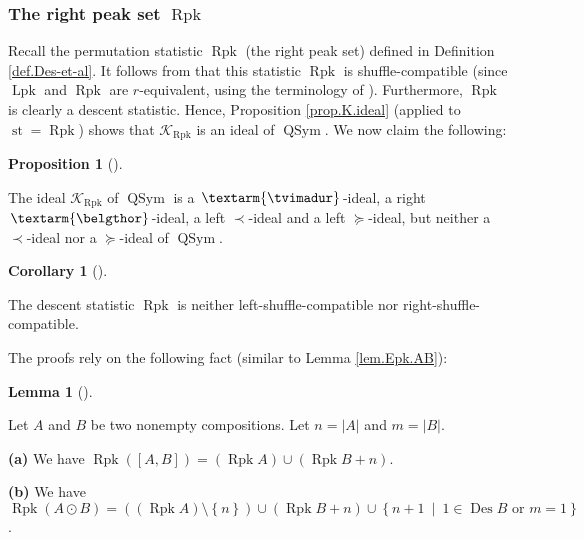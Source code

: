 \documentclass[numbers=enddot,12pt,final,onecolumn,notitlepage]{scrartcl}%
\theoremstyle{definition}
\newtheorem{lem}[theo]{Lemma}
\newenvironment{lemma}[1][]
{\begin{lem}[#1]\begin{leftbar}}
{\end{leftbar}\end{lem}}
\newtheorem{prop}[theo]{Proposition}
\newenvironment{proposition}[1][]
{\begin{prop}[#1]\begin{leftbar}}
{\end{leftbar}\end{prop}}
\newtheorem{coro}[theo]{Corollary}
\newenvironment{corollary}[1][]
{\begin{coro}[#1]\begin{leftbar}}
{\end{leftbar}\end{coro}}
\newcommand{\tvi}{\left. \textarm{\tvimadur} \right.}
\newcommand{\bel}{\left. \textarm{\belgthor} \right.}
\begin{document}
\subsubsection{The right peak set $\operatorname*{Rpk}$}

Recall the permutation statistic $\operatorname*{Rpk}$ (the right peak set)
defined in Definition \ref{def.Des-et-al}. It follows from \cite[Theorem 4.9
\textbf{(a)} and Theorem 3.5]{part1} that this statistic $\operatorname*{Rpk}$
is shuffle-compatible (since $\operatorname{Lpk}$ and $\operatorname{Rpk}$ are
$r$-equivalent, using the terminology of \cite{part1}). Furthermore,
$\operatorname*{Rpk}$ is clearly a descent statistic. Hence, Proposition
\ref{prop.K.ideal} (applied to $\operatorname*{st}=\operatorname*{Rpk}$) shows
that $\mathcal{K}_{\operatorname*{Rpk}}$ is an ideal of $\operatorname*{QSym}%
$. We now claim the following:

\begin{proposition}
\label{prop.Rpk.dend}The ideal $\mathcal{K}_{\operatorname*{Rpk}}$ of
$\operatorname*{QSym}$ is a $\tvi$-ideal, a right $\bel$-ideal, a left
$\left.  \prec\right.  $-ideal and a left $\left.  \succeq\right.  $-ideal,
but neither a $\left.  \prec\right.  $-ideal nor a $\left.  \succeq\right.
$-ideal of $\operatorname*{QSym}$.
\end{proposition}

\begin{corollary}
\label{cor.dendri.Rpk}The descent statistic $\operatorname*{Rpk}$ is neither
left-shuffle-compatible nor right-shuffle-compatible.
\end{corollary}

The proofs rely on the following fact (similar to Lemma \ref{lem.Epk.AB}):

\begin{lemma}
\label{lem.Rpk.AB}Let $A$ and $B$ be two nonempty compositions. Let
$n=\left\vert A\right\vert $ and $m=\left\vert B\right\vert $.

\textbf{(a)} We have $\operatorname*{Rpk}\left(  \left[  A,B\right]  \right)
=\left(  \operatorname*{Rpk}A\right)  \cup\left(  \operatorname*{Rpk}%
B+n\right)  $.

\textbf{(b)} We have $\operatorname*{Rpk}\left(  A\odot B\right)  =\left(
\left(  \operatorname*{Rpk}A\right)  \setminus\left\{  n\right\}  \right)
\cup\left(  \operatorname*{Rpk}B+n\right)  \cup\left\{  n+1\ \mid
\ 1\in\operatorname*{Des}B\text{ or }m=1\right\}  $.
\end{lemma}
\end{document}

